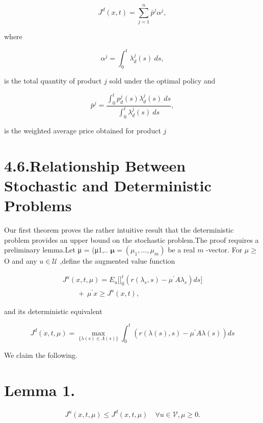 \[
J ^ { d } ( x , t ) = \sum _ { j = 1 } ^ { n } \bar { p } ^ { j } \alpha ^ { j } ,
\]

where

\[
\alpha ^ { j } = \int _ { 0 } ^ { t } \lambda _ { d } ^ { j } ( s ) ~ d s ,
\]

is the total quantity of product \(j\) sold under the optimal policy and

\[
\bar { p } ^ { j } = \frac { \int _ { 0 } ^ { t } p _ { d } ^ { j } ( s ) \lambda _ { d } ^ { j } ( s ) ~ d s } { \int _ { 0 } ^ { t } \lambda _ { d } ^ { j } ( s ) ~ d s } ,
\]

is the weighted average price obtained for product \(j\)

\section{4.6.Relationship Between Stochastic and Deterministic
Problems}\label{relationship-between-stochastic-and-deterministic-problems}

Our first theorem proves the rather intuitive result that the
deterministic problem provides an upper bound on the stochastic
problem.The proof requires a preliminary lemma.Let μ = (μ1,..
\(\pmb { \mu } = ( \mu _ { 1 } , \ldots , \mu _ { m } )\) be a real
\(m\) -vector. For \(\mu \geqslant\) O and any \(u \in \mathcal { U }\)
,define the augmented value function

\[
\begin{array} { l } { { J ^ { u } ( x , t , \mu ) = E _ { u } \Bigg [ \Bigg ] _ { 0 } ^ { t } \left( r ( \lambda _ { s } , s ) - \mu ^ { \prime } A \lambda _ { s } \right) d s \Bigg ] } } \\ { { \quad \quad + \ \mu ^ { \prime } x \geqslant J ^ { u } ( x , t ) , } } \end{array}
\]

and its deterministic equivalent

\[
J ^ { d } ( x , t , \mu ) = \operatorname* { m a x } _ { \{ \lambda ( s ) \in \Lambda ( s ) \} } \int _ { 0 } ^ { t } \left( r ( \lambda ( s ) , s ) - \mu ^ { \prime } A \lambda ( s ) \right) d s
\]

We claim the following.

\section{Lemma 1.}\label{lemma-1.}

\[
J ^ { u } ( x , t , \mu ) \leqslant J ^ { d } ( x , t , \mu ) \quad \forall u \in \mathcal { V } , \mu \geqslant 0 .
\]


